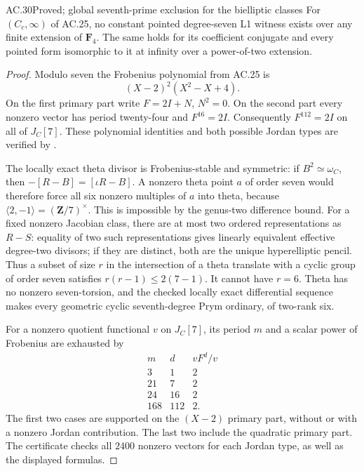 \begin{claim}{AC.30}{Proved; global seventh-prime exclusion for the bielliptic classes}
For $(C_c,\infty)$ of AC.25, no constant pointed degree-seven
L1 witness exists over any finite extension of $\mathbf F_4$.
The same holds for its coefficient conjugate and every pointed
form isomorphic to it at infinity over a power-of-two extension.
\end{claim}
\begin{proof}
Modulo seven the Frobenius polynomial from AC.25 is
\[
                  (X-2)^2(X^2-X+4).
\]
On the first primary part write $F=2I+N$, $N^2=0$.
On the second part every nonzero vector has period twenty-four
and $F^{16}=2I$. Consequently $F^{112}=2I$ on all of $J_C[7]$.
These polynomial identities and both possible Jordan types are
verified by .

The locally exact theta divisor is Frobenius-stable and symmetric:
if $B^2\simeq\omega_C$, then
$-[R-B]=[\iota R-B]$. A nonzero theta point $a$ of order seven
would therefore force all six nonzero multiples of $a$ into theta,
because $\langle2,-1\rangle=(\mathbf Z/7)^\times$.
This is impossible by the genus-two difference bound.
For a fixed nonzero Jacobian class, there are at most two ordered
representations as $R-S$: equality of two such representations
gives linearly equivalent effective degree-two divisors; if they
are distinct, both are the unique hyperelliptic pencil.
Thus a subset of size $r$ in the intersection of a theta translate
with a cyclic group of order seven satisfies
$r(r-1)\le2(7-1)$. It cannot have $r=6$.
Theta has no nonzero seven-torsion, and the checked locally exact
differential sequence makes every geometric cyclic seventh-degree
Prym ordinary, of two-rank six.

For a nonzero quotient functional $v$ on $J_C[7]$, its period $m$
and a scalar power of Frobenius are exhausted by
\[
 \begin{array}{c|c|c}
 m&d&vF^d/v\\\hline
 3&1&2\\
 21&7&2\\
 24&16&2\\
 168&112&2.
 \end{array}
\]
The first two cases are supported on the $(X-2)$ primary part,
without or with a nonzero Jordan contribution.
The last two include the quadratic primary part.
The certificate checks all $2400$ nonzero vectors for each Jordan
type, as well as the displayed formulas.


\end{proof}
